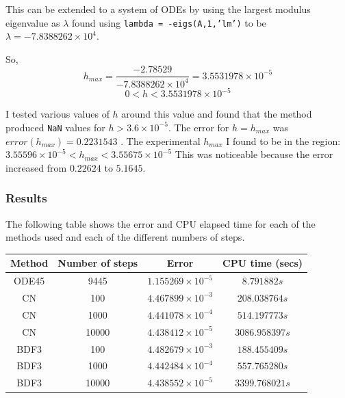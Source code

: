 \documentclass[a4paper, 11pt]{article}
\begin{document}
				This can be extended to a system of ODEs by using the largest modulus eigenvalue as $ \lambda $ found using \texttt{lambda = -eigs(A,1,’lm’)} to be $ \lambda = -7.8388262\times 10^{4} $.		
				
				So, 
				\begin{equation}
					h_{max} = \frac{-2.78529}{-7.8388262\times 10^{4}} = 3.5531978\times 10^{-5} 
				\end{equation}
				\begin{equation}
					0 < h < 3.5531978\times 10^{-5} 
				\end{equation}
			 
				I tested various values of $h$ around this value and found that the method produced \texttt{NaN} values for $h > 3.6\times 10^{-5} $.
				The error for $ h = h_{max}$ was $error(h_{max}) = 0.2231543$ .
				The experimental $h_{max}$ I found to be in the region: $ 3.55596 \times 10^{-5} < h_{max} < 3.55675 \times 10^{-5}$
				This was noticeable because the error increased from $ 0.22624 $ to $ 5.1645 $.
				
				
			\subsubsection*{Results}
			
				The following table shows the error and CPU elapsed time for each of the methods used and each of the different numbers of steps.
				
				\begin{table}[H]
					\centering
					\begin{tabular}{c|c|c|c}
						\textbf{Method} & \textbf{Number of steps} 	& \textbf{Error}  				& \textbf{CPU time (secs)}  	\\ \hline
						ODE45 			& 9445 						& $ 1.155269\times 10^{-5} $ 	& $ 8.791882 s $ 				\\ \hline 
						CN 				& 100 						& $ 4.467899\times 10^{-3} $ 	& $ 208.038764 s $ 				\\ \hline
						CN 				& 1000 						& $ 4.441078\times 10^{-4} $ 	& $ 514.197773 s $ 				\\ \hline
						CN 				& 10000 					& $ 4.438412\times 10^{-5} $ 	& $ 3086.958397 s $				\\ \hline
						BDF3 			& 100				 		& $ 4.482679\times 10^{-3} $ 	& $ 188.455409 s $ 				\\ \hline
						BDF3 			& 1000						& $ 4.442484\times 10^{-4} $ 	& $ 557.765280 s $ 				\\ \hline
						BDF3 			& 10000 					& $ 4.438552\times 10^{-5} $ 	& $ 3399.768021 s $ 			\\ \hline
					\end{tabular}
				\end{table}
				
\end{document}
